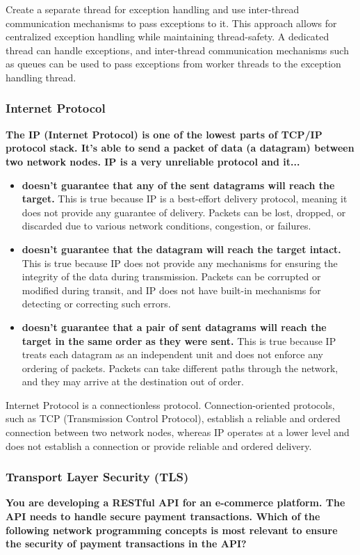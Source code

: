Create a separate thread for exception handling and use inter-thread communication mechanisms to pass exceptions to it. This approach allows for centralized exception handling while maintaining thread-safety. A dedicated thread can handle exceptions, and inter-thread communication mechanisms such as queues can be used to pass exceptions from worker threads to the exception handling thread.

\subsubsection{Internet Protocol}
\textbf{The IP (Internet Protocol) is one of the lowest parts of TCP/IP protocol stack. It's able to send a packet of data (a datagram) between two network nodes. IP is a very unreliable protocol and it... }
\begin{itemize}
\item \textbf{doesn't guarantee that any of the sent datagrams will reach the target.} This is true because IP is a best-effort delivery protocol, meaning it does not provide any guarantee of delivery. Packets can be lost, dropped, or discarded due to various network conditions, congestion, or failures.
\item \textbf{doesn't guarantee that the datagram will reach the target intact.} This is true because IP does not provide any mechanisms for ensuring the integrity of the data during transmission. Packets can be corrupted or modified during transit, and IP does not have built-in mechanisms for detecting or correcting such errors.
\item \textbf{doesn't guarantee that a pair of sent datagrams will reach the target in the same order as they were sent.} This is true because IP treats each datagram as an independent unit and does not enforce any ordering of packets. Packets can take different paths through the network, and they may arrive at the destination out of order.
\end{itemize}

Internet Protocol is a connectionless protocol. Connection-oriented protocols, such as TCP (Transmission Control Protocol), establish a reliable and ordered connection between two network nodes, whereas IP operates at a lower level and does not establish a connection or provide reliable and ordered delivery.

\subsubsection{Transport Layer Security (TLS)}
\textbf{You are developing a RESTful API for an e-commerce platform. The API needs to handle secure payment transactions. Which of the following network programming concepts is most relevant to ensure the security of payment transactions in the API?}

